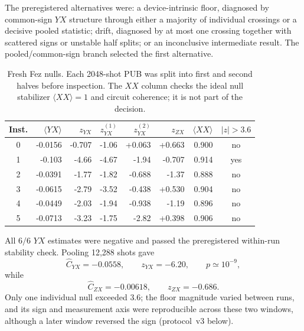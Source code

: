\documentclass[aps,prl,onecolumn,superscriptaddress,nofootinbib]{revtex4-2}
\begin{document}
The preregistered alternatives were: a device-intrinsic floor, diagnosed by common-sign $YX$ structure through either a majority of individual crossings or a decisive pooled statistic; drift, diagnosed by at most one crossing together with scattered signs or unstable half splits; or an inconclusive intermediate result.  The pooled/common-sign branch selected the first alternative.

\begin{table}[t]
\caption{Fresh Fez nulls.  Each 2048-shot PUB was split into first and second halves before inspection.  The $XX$ column checks the ideal null stabilizer $\langle XX\rangle=1$ and circuit coherence; it is not part of the decision.}
\label{tab:fez-null-confirmation}
\begin{ruledtabular}
\begin{tabular}{crrrrrrc}
Inst. & $\langle YX\rangle$ & $z_{YX}$ & $z_{YX}^{(1)}$ & $z_{YX}^{(2)}$ & $z_{ZX}$ & $\langle XX\rangle$ & $|z|>3.6$\\
\hline
0 & -0.0156 & -0.707 & -1.06 & +0.063 & +0.663 & 0.900 & no\\
1 & -0.103 & -4.66 & -4.67 & -1.94 & -0.707 & 0.914 & yes\\
2 & -0.0391 & -1.77 & -1.82 & -0.688 & -1.37 & 0.888 & no\\
3 & -0.0615 & -2.79 & -3.52 & -0.438 & +0.530 & 0.904 & no\\
4 & -0.0449 & -2.03 & -1.94 & -0.938 & -1.19 & 0.896 & no\\
5 & -0.0713 & -3.23 & -1.75 & -2.82 & +0.398 & 0.906 & no\\
\end{tabular}
\end{ruledtabular}
\end{table}

All $6/6$ $YX$ estimates were negative and passed the preregistered within-run stability check.  Pooling 12,288 shots gave
\begin{equation}
 \widehat C_{YX}=-0.0558,
 \qquad z_{YX}=-6.20,
 \qquad p\simeq10^{-9},
 \label{eq:fez-pooled-yx}
\end{equation}
while
\begin{equation}
 \widehat C_{ZX}=-0.00618,
 \qquad z_{ZX}=-0.686.
 \label{eq:fez-pooled-zx}
\end{equation}
Only one individual null exceeded $3.6$; the floor magnitude varied between runs, and its sign and measurement axis were reproducible across these two windows, although a later window reversed the sign (protocol~v3 below).
\end{document}
